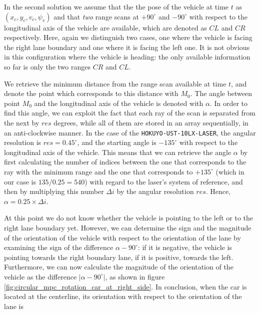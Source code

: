 In the second solution we assume that the the pose of the vehicle at time $t$ as
$(x_c, y_c, v_c, \psi_v)$ and that \textit{two} range scans at $+90^\circ$
and $-90^\circ$ with respect to the longitudinal axis of the vehicle are
available, which are denoted as $CL$ and $CR$ respectively. Here, again we
distinguish two cases, one where the vehicle is facing the right
lane boundary and one where it is facing the left one. It is not obvious
in this configuration where the vehicle is heading: the only available
information so far is only the two ranges $CR$ and $CL$.

We retrieve the  minimum distance from the range scan available at
time $t$, and denote the point which corresponds to this distance with $M_0$. The
angle between point $M_0$ and the longitudinal axis of the vehicle is denoted with
$\alpha$. In order to find this angle, we can exploit the fact that each ray
of the scan is separated from the next by $res$ degrees, while all of them
are stored in an array sequentially, in an anti-clockwise manner. In the case
of the \texttt{HOKUYO-UST-10LX-LASER}, the angular resolution is
$res=0.45^{\circ}$, and the starting angle is $-135^{\circ}$ with respect to the
longitudinal axis of the vehicle. This means that we can retrieve the angle
$\alpha$ by first calculating the number of indices between the one that
corresponds to the ray with the minimum range and the one that corresponds
to $+135^{\circ}$ (which in our case is $135 / 0.25 = 540$) with regard to the
laser's system of reference, and then by multiplying this number $\Delta i$ by
the angular resolution $res$. Hence, $\alpha = 0.25 \times \Delta i$.


\begin{figure}[H]\centering
  \scalebox{1}{}
  \caption{}
  \label{}
\end{figure}

At this point we do not know whether the vehicle is pointing to the
left or to the right lane boundary yet. However, we can determine the sign and the
magnitude of the orientation of the vehicle with respect to the orientation of
the lane by examining the sign of the difference $\alpha - 90^{\circ}$:
if it is negative, the vehicle is pointing towards the right boundary lane,
if it is positive, towards the left. Furthermore, we can now
calculate the magnitude of the orientation of the vehicle as the difference
$|\alpha - 90^{\circ}|$, as shown in figure \ref{fig:circular_mpc_rotation_car_at_right_side}.
In conclusion, when the car is located at the centerline, its orientation with
respect to the orientation of the lane is

